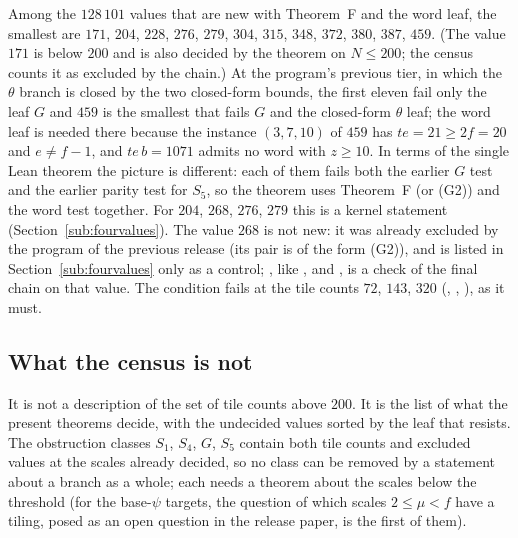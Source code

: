 \documentclass[11pt,reqno]{amsart}
\theoremstyle{plain}
\theoremstyle{definition}
\begin{document}
Among the $128\,101$ values that are new with Theorem~F and the word leaf, the smallest are $171$, $204$, $228$, $276$, $279$, $304$, $315$, $348$, $372$, $380$, $387$, $459$. (The value $171$ is below $200$ and is also decided by the theorem on $N\le200$; the census counts it as excluded by the chain.) At the program's previous tier, in which the $\theta$ branch is closed by the two closed-form bounds, the first eleven fail only the leaf $G$ and $459$ is the smallest that fails $G$ and the closed-form $\theta$ leaf; the word leaf is needed there because the instance $(3,7,10)$ of $459$ has $te=21\ge2f=20$ and $e\ne f-1$, and $te\,b=1071$ admits no word with $z\ge10$. In terms of the single Lean theorem the picture is different: each of them fails both the earlier $G$ test and the earlier parity test for $S_5$, so the theorem uses Theorem~F (or (G2)) and the word test together. For $204$, $268$, $276$, $279$ this is a kernel statement (Section~\ref{sub:fourvalues}). The value $268$ is not new: it was already excluded by the program of the previous release (its pair is of the form (G2)), and is listed in Section~\ref{sub:fourvalues} only as a control; , like ,  and , is a check of the final chain on that value. The
condition fails at the tile counts $72$, $143$, $320$ (, ,
), as it must.

\subsection{What the census is not}
It is not a description of the set of tile counts above $200$. It is the list of what the present theorems decide, with the
undecided values sorted by the leaf that resists. The obstruction classes $S_1$, $S_4$, $G$, $S_5$ contain both tile counts and excluded values at
the scales already decided, so no class can be removed by a statement about a branch as a whole; each needs a theorem about the
scales below the threshold (for the base-$\psi$ targets, the question of which scales $2\le \mu<f$ have a tiling, posed as an open question in the release paper, is the first of them).


\end{document}
